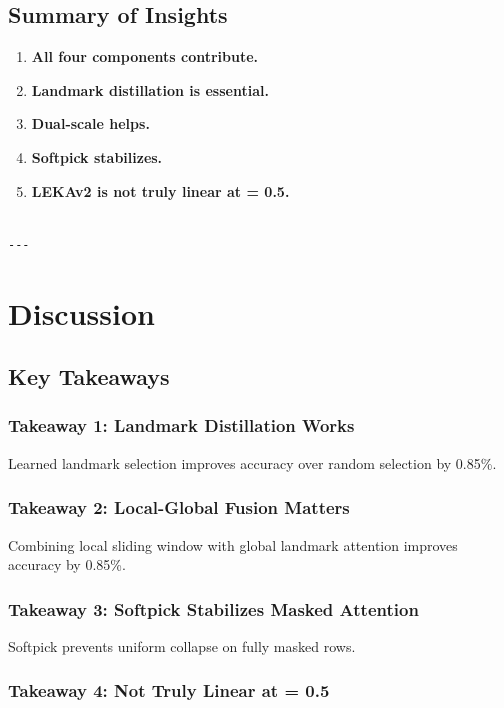\subsection{Summary of Insights}

\begin{enumerate}
\item \textbf{All four components contribute.}
\item \textbf{Landmark distillation is essential.}
\item \textbf{Dual-scale helps.}
\item \textbf{Softpick stabilizes.}
\item \textbf{LEKAv2 is not truly linear at   = 0.5.}
\end{enumerate}
\begin{lstlisting}

---
\end{lstlisting}

\section{Discussion}

\subsection{Key Takeaways}

\subsubsection{Takeaway 1: Landmark Distillation Works}

Learned landmark selection improves accuracy over random selection by 
0.85\%.

\subsubsection{Takeaway 2: Local-Global Fusion Matters}

Combining local sliding window with global landmark attention improves 
accuracy by 0.85\%.

\subsubsection{Takeaway 3: Softpick Stabilizes Masked Attention}

Softpick prevents uniform collapse on fully masked rows.

\subsubsection{Takeaway 4: Not Truly Linear at   = 0.5}

